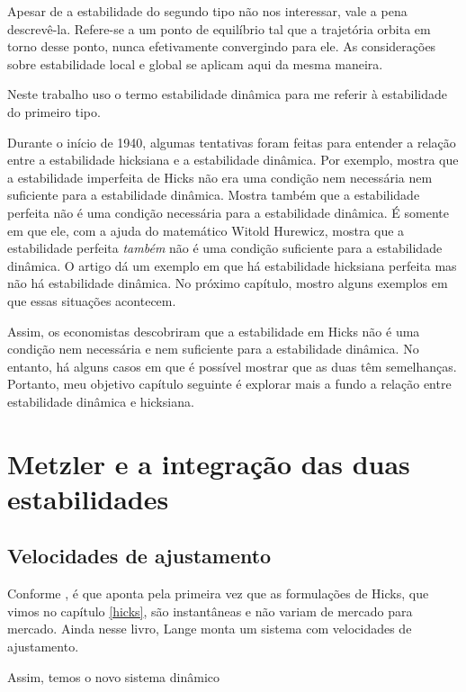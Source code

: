 \documentclass[
	12pt,				%
	openright,			%
	twoside,			%
	a4paper,			%
	english,			%
	french,				%
	spanish,			%
	brazil				%
	]{abntex2}
\begin{document}
Apesar de a estabilidade do segundo tipo não nos interessar, vale a pena
descrevê-la. Refere-se a um ponto de equilíbrio tal que a trajetória orbita em torno desse ponto,
nunca efetivamente convergindo para ele. As considerações sobre estabilidade local
e global se aplicam aqui da mesma maneira.

Neste trabalho uso o termo estabilidade dinâmica para me referir à estabilidade do
primeiro tipo.

Durante o início de 1940, algumas tentativas foram feitas para entender a relação
entre a estabilidade hicksiana e a estabilidade dinâmica. Por exemplo,
 mostra que a estabilidade imperfeita de Hicks não
era uma condição nem necessária nem suficiente para a estabilidade dinâmica.
Mostra também que a estabilidade perfeita não é uma condição necessária para
a estabilidade dinâmica. É somente em \citeyear{samuelson1944} que ele, com a
ajuda do matemático  Witold Hurewicz, mostra que a estabilidade perfeita
\textit{também} não é uma condição suficiente para a estabilidade dinâmica. O artigo dá um
exemplo em que há estabilidade hicksiana perfeita mas não há estabilidade dinâmica.
No próximo capítulo, mostro alguns exemplos em que essas situações acontecem.

Assim, os economistas descobriram que a estabilidade em Hicks não é uma condição
nem necessária e nem suficiente para a estabilidade dinâmica. No entanto, há
alguns casos em que é possível mostrar que as duas têm semelhanças. Portanto,
meu objetivo capítulo seguinte é explorar mais a fundo a relação entre estabilidade
dinâmica e hicksiana.

\chapter{Metzler e a integração das duas estabilidades} \label{metzler}

\section{Velocidades de ajustamento}

Conforme , é  que aponta pela primeira
vez que as formulações de Hicks, que vimos no capítulo \ref{hicks},
são instantâneas e não variam de mercado para mercado.
Ainda nesse livro, Lange monta um sistema com velocidades de
ajustamento.

Assim, temos o novo sistema dinâmico
\end{document}
